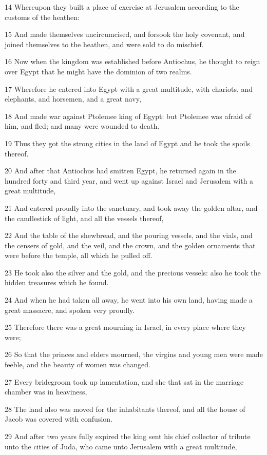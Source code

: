 \par 14 Whereupon they built a place of exercise at Jerusalem according to the customs of the heathen:
\par 15 And made themselves uncircumcised, and forsook the holy covenant, and joined themselves to the heathen, and were sold to do mischief.
\par 16 Now when the kingdom was established before Antiochus, he thought to reign over Egypt that he might have the dominion of two realms.
\par 17 Wherefore he entered into Egypt with a great multitude, with chariots, and elephants, and horsemen, and a great navy,
\par 18 And made war against Ptolemee king of Egypt: but Ptolemee was afraid of him, and fled; and many were wounded to death.
\par 19 Thus they got the strong cities in the land of Egypt and he took the spoils thereof.
\par 20 And after that Antiochus had smitten Egypt, he returned again in the hundred forty and third year, and went up against Israel and Jerusalem with a great multitude,
\par 21 And entered proudly into the sanctuary, and took away the golden altar, and the candlestick of light, and all the vessels thereof,
\par 22 And the table of the shewbread, and the pouring vessels, and the vials, and the censers of gold, and the veil, and the crown, and the golden ornaments that were before the temple, all which he pulled off.
\par 23 He took also the silver and the gold, and the precious vessels: also he took the hidden treasures which he found.
\par 24 And when he had taken all away, he went into his own land, having made a great massacre, and spoken very proudly.
\par 25 Therefore there was a great mourning in Israel, in every place where they were;
\par 26 So that the princes and elders mourned, the virgins and young men were made feeble, and the beauty of women was changed.
\par 27 Every bridegroom took up lamentation, and she that sat in the marriage chamber was in heaviness,
\par 28 The land also was moved for the inhabitants thereof, and all the house of Jacob was covered with confusion.
\par 29 And after two years fully expired the king sent his chief collector of tribute unto the cities of Juda, who came unto Jerusalem with a great multitude,

